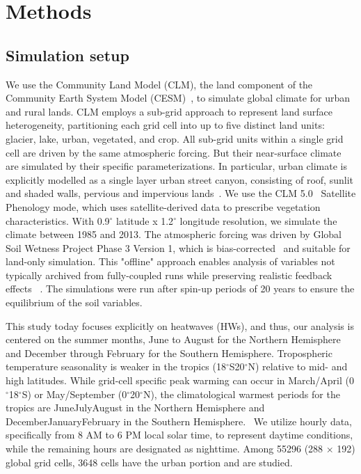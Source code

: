 \section*{Methods}




\subsection*{Simulation setup }We use the Community Land Model (CLM), the land component of the Community Earth System Model (CESM)\unskip~\cite{2755510:33598890}, to simulate global climate for urban and rural lands. CLM employs a sub-grid approach to represent land surface heterogeneity, partitioning each grid cell into up to five distinct land units:   glacier, lake, urban, vegetated, and crop. All sub-grid units within a single grid cell are driven by the same atmospheric forcing. But their near-surface climate are simulated by their specific parameterizations. In particular, urban climate is explicitly modelled as a single layer urban street canyon, consisting of roof, sunlit and shaded walls, pervious and impervious lands\unskip~\cite{oleson2004technical}. We use the CLM 5.0\unskip~\cite{2755510:33598910}  Satellite Phenology mode, which uses satellite-derived data to prescribe vegetation characteristics. With 0.9\ensuremath{^\circ} latitude x 1.2\ensuremath{^\circ} longitude resolution, we simulate the climate between 1985 and 2013.  The atmospheric forcing was driven by Global Soil Wetness Project Phase 3 Version 1, which is bias-corrected\unskip~\cite{2755510:33598910}  and suitable for land-only simulation. This "offline" approach enables analysis of variables not typically archived from fully-coupled runs while preserving realistic feedback effects\unskip~\cite{2755510:33598945} . The simulations were run after spin-up periods of 20 years to ensure the equilibrium of the soil variables.

This study today focuses explicitly on heatwaves (HWs), and thus, our analysis is centered on the summer months, June to August for the Northern Hemisphere and December through February for the Southern Hemisphere. Tropospheric temperature seasonality is weaker in the tropics (18\ensuremath{^\circ}S{\textendash}20\ensuremath{^\circ}N) relative to mid- and high latitudes. While grid-cell specific peak warming can occur in March/April (0\ensuremath{^\circ}{\textendash}18\ensuremath{^\circ}S) or May/September (0\ensuremath{^\circ}{\textendash}20\ensuremath{^\circ}N), the climatological warmest periods for the tropics are June{\textendash}July{\textendash}August in the Northern Hemisphere and December{\textendash}January{\textendash}February in the Southern Hemisphere.\unskip~\cite{2755510:33598947}  We utilize hourly data, specifically from 8 AM to 6 PM local solar time, to represent daytime conditions, while the remaining hours are designated as nighttime. Among 55296 (288 \ensuremath{\times} 192) global grid cells, 3648 cells have the urban portion and are studied.





